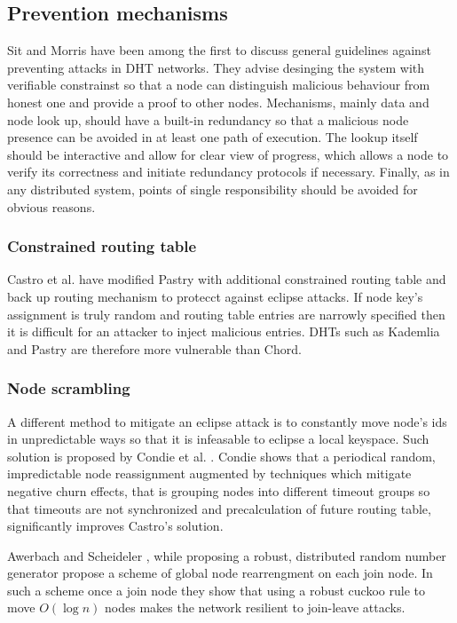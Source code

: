   \subsection{Prevention mechanisms}

  Sit and Morris \cite{sit02} have been among the first to discuss general
  guidelines against preventing attacks in DHT networks. They advise desinging
  the system with verifiable constrainst so that a node can distinguish
  malicious behaviour from honest one and provide a proof to other nodes.
  Mechanisms, mainly data and node look up, should have a built-in redundancy so
  that a malicious node presence can be avoided in at least one path of
  execution. The lookup itself should be interactive and allow for clear view of
  progress, which allows a node to verify its correctness and initiate
  redundancy protocols if necessary. Finally, as in any distributed system,
  points of single responsibility should be avoided for obvious reasons.
  
  \subsubsection{Constrained routing table}
  Castro et al. \cite[p. 20]{urd11} have modified Pastry with additional
  constrained routing table and back up routing mechanism to protecct against
  eclipse attacks. If node key's assignment is truly random and routing table
  entries are narrowly specified then it is difficult for an attacker to inject
  malicious entries. DHTs such as Kademlia and Pastry are therefore more
  vulnerable than Chord.

  \subsubsection{Node scrambling}
  A different method to mitigate an eclipse attack is to constantly move node's
  ids in unpredictable ways so that it is infeasable to eclipse a local
  keyspace. Such solution is proposed by Condie et al. \cite[p. 21]{urd11}.
  Condie shows that a periodical random, impredictable node reassignment
  augmented by techniques which mitigate negative churn effects, that is
  grouping nodes into different timeout groups so that timeouts are not
  synchronized and precalculation of future routing table, significantly
  improves Castro's solution.

  Awerbach and Scheideler \cite{awe10}, while proposing a robust, distributed
  random number generator propose a scheme of global node rearrengment on each
  join node. In such a scheme once a join node they show that using a robust
  cuckoo rule to move $O(\log n)$ nodes makes the network resilient to
  join-leave attacks.

